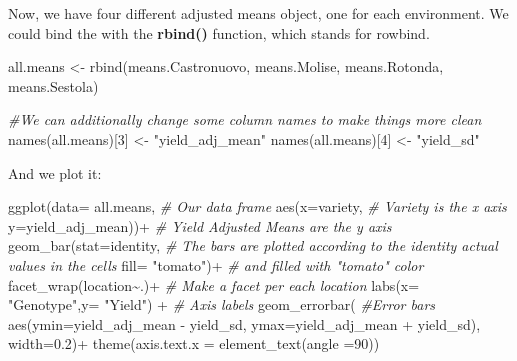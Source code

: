 \documentclass[
]{book}
\newenvironment{Shaded}{\begin{snugshade}}{\end{snugshade}}
\newcommand{\AttributeTok}[1]{\textcolor[rgb]{0.77,0.63,0.00}{#1}}
\newcommand{\CommentTok}[1]{\textcolor[rgb]{0.56,0.35,0.01}{\textit{#1}}}
\newcommand{\DecValTok}[1]{\textcolor[rgb]{0.00,0.00,0.81}{#1}}
\newcommand{\FloatTok}[1]{\textcolor[rgb]{0.00,0.00,0.81}{#1}}
\newcommand{\FunctionTok}[1]{\textcolor[rgb]{0.00,0.00,0.00}{#1}}
\newcommand{\NormalTok}[1]{#1}
\newcommand{\OtherTok}[1]{\textcolor[rgb]{0.56,0.35,0.01}{#1}}
\newcommand{\SpecialCharTok}[1]{\textcolor[rgb]{0.00,0.00,0.00}{#1}}
\newcommand{\StringTok}[1]{\textcolor[rgb]{0.31,0.60,0.02}{#1}}
\begin{document}
Now, we have four different adjusted means object, one for each environment. We could bind the with the \textbf{rbind()} function, which stands for rowbind.

\begin{Shaded}
\begin{Highlighting}[]
\NormalTok{all.means }\OtherTok{\textless{}{-}} \FunctionTok{rbind}\NormalTok{(means.Castronuovo, means.Molise, means.Rotonda, means.Sestola)}

\CommentTok{\#We can additionally change some column names to make things more clean}
\FunctionTok{names}\NormalTok{(all.means)[}\DecValTok{3}\NormalTok{] }\OtherTok{\textless{}{-}} \StringTok{"yield\_adj\_mean"}
\FunctionTok{names}\NormalTok{(all.means)[}\DecValTok{4}\NormalTok{] }\OtherTok{\textless{}{-}} \StringTok{"yield\_sd"}
\end{Highlighting}
\end{Shaded}

And we plot it:

\begin{Shaded}
\begin{Highlighting}[]
\FunctionTok{ggplot}\NormalTok{(}\AttributeTok{data=}\NormalTok{ all.means,                     }\CommentTok{\# Our data frame}
       \FunctionTok{aes}\NormalTok{(}\AttributeTok{x=}\NormalTok{variety,                       }\CommentTok{\# Variety is the x axis}
           \AttributeTok{y=}\NormalTok{yield\_adj\_mean))}\SpecialCharTok{+}              \CommentTok{\# Yield Adjusted Means are the y axis}
  \FunctionTok{geom\_bar}\NormalTok{(}\AttributeTok{stat=}\StringTok{\textquotesingle{}identity\textquotesingle{}}\NormalTok{,                 }\CommentTok{\# The bars are plotted according to the identity actual values in the cells}
           \AttributeTok{fill=} \StringTok{"tomato"}\NormalTok{)}\SpecialCharTok{+}                 \CommentTok{\# and filled with "tomato" color}
  \FunctionTok{facet\_wrap}\NormalTok{(location}\SpecialCharTok{\textasciitilde{}}\NormalTok{.)}\SpecialCharTok{+}                        \CommentTok{\# Make a facet per each location }
  \FunctionTok{labs}\NormalTok{(}\AttributeTok{x=} \StringTok{"Genotype"}\NormalTok{,}\AttributeTok{y=} \StringTok{"Yield"}\NormalTok{)  }\SpecialCharTok{+}         \CommentTok{\# Axis labels}
  \FunctionTok{geom\_errorbar}\NormalTok{(                            }\CommentTok{\#Error bars}
          \FunctionTok{aes}\NormalTok{(}\AttributeTok{ymin=}\NormalTok{yield\_adj\_mean }\SpecialCharTok{{-}}\NormalTok{ yield\_sd, }
              \AttributeTok{ymax=}\NormalTok{yield\_adj\_mean }\SpecialCharTok{+}\NormalTok{ yield\_sd),}
              \AttributeTok{width=}\FloatTok{0.2}\NormalTok{)}\SpecialCharTok{+}
  \FunctionTok{theme}\NormalTok{(}\AttributeTok{axis.text.x =} \FunctionTok{element\_text}\NormalTok{(}\AttributeTok{angle =}\DecValTok{90}\NormalTok{))}
\end{Highlighting}
\end{Shaded}
\end{document}
